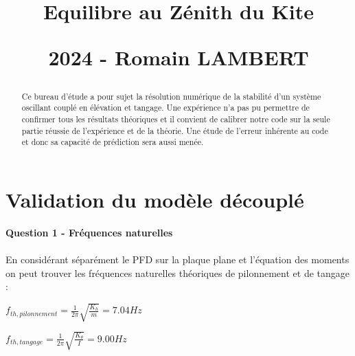 \documentclass[conference]{IEEEtran}
\begin{document}
\title{\LARGE Equilibre au Zénith du Kite
\vskip10pt

\small 2024 - Romain LAMBERT
}

\maketitle

\begin{abstract}
Ce bureau d'étude a pour sujet la résolution numérique de la stabilité d'un système oscillant couplé en élévation et tangage. Une expérience n'a pas pu permettre de confirmer tous les résultats théoriques et il convient de calibrer notre code sur la seule partie réussie de l'expérience et de la théorie. Une étude de l'erreur inhérente au code et donc sa capacité de prédiction sera aussi menée. 
\end{abstract}
\IEEEoverridecommandlockouts
\IEEEpeerreviewmaketitle
\section{Validation du modèle découplé}

\textbf{Question 1 -  Fréquences naturelles} 
\\ \\
En considérant séparément le PFD sur la plaque plane et l'équation des moments on peut trouver les fréquences naturelles théoriques de pilonnement et de tangage : 
\begin{center}
    $f_{th,pilonnement} = \frac{1}{2\pi}\sqrt{\frac{K_h}{m}} =  7.04 Hz$ 
\end{center}
\begin{center}
    $f_{th,tangage} = \frac{1}{2\pi}\sqrt{\frac{K_\theta}{I}} = 9.00 Hz$
\end{center}
\end{document}
